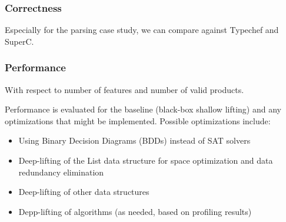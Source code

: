 \documentclass[12pt]{article}
\begin{document}
\subsubsection{Correctness}
Especially for the parsing case study, we can compare against Typechef and SuperC.

\subsubsection{Performance}
With respect to number of features and number of valid products.

Performance is evaluated for the baseline (black-box shallow lifting) and any optimizations that might be implemented. Possible optimizations include:
\begin{itemize}
	\item Using Binary Decision Diagrams (BDDs) instead of SAT solvers
	\item Deep-lifting of the List data structure for space optimization and data redundancy elimination
	\item Deep-lifting of other data structures
	\item Depp-lifting of algorithms (as needed, based on profiling results) 
\end{itemize}
\end{document}
